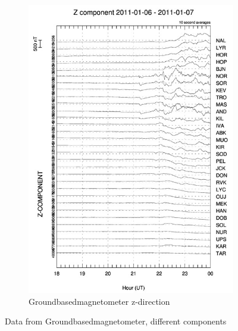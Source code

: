 \documentclass[10pt,a4paper]{article}
\begin{document}
\begin{figure}[h]
\begin{subfigure}{0.3\textwidth}
	\includegraphics[width=\textwidth]{Z_gram.jpg}
	\caption{  Groundbasedmagnetometer z-direction\label{GBM_Z}}
\end{subfigure}
\caption{Data from Groundbasedmagnetometer, different components }
\label{GBM_all in all}
\end{figure}
\end{document}
